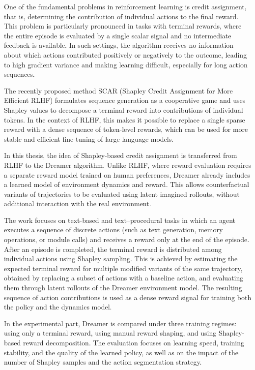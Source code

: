 One of the fundamental problems in reinforcement learning is credit assignment, that is, determining the contribution of individual actions to the final reward. This problem is particularly pronounced in tasks with terminal rewards, where the entire episode is evaluated by a single scalar signal and no intermediate feedback is available. In such settings, the algorithm receives no information about which actions contributed positively or negatively to the outcome, leading to high gradient variance and making learning difficult, especially for long action sequences.

The recently proposed method SCAR (Shapley Credit Assignment for More Efficient RLHF) formulates sequence generation as a cooperative game and uses Shapley values to decompose a terminal reward into contributions of individual tokens. In the context of RLHF, this makes it possible to replace a single sparse reward with a dense sequence of token-level rewards, which can be used for more stable and efficient fine-tuning of large language models.

In this thesis, the idea of Shapley-based credit assignment is transferred from RLHF to the Dreamer algorithm. Unlike RLHF, where reward evaluation requires a separate reward model trained on human preferences, Dreamer already includes a learned model of environment dynamics and reward. This allows counterfactual variants of trajectories to be evaluated using latent imagined rollouts, without additional interaction with the real environment.

The work focuses on text-based and text--procedural tasks in which an agent executes a sequence of discrete actions (such as text generation, memory operations, or module calls) and receives a reward only at the end of the episode. After an episode is completed, the terminal reward is distributed among individual actions using Shapley sampling. This is achieved by estimating the expected terminal reward for multiple modified variants of the same trajectory, obtained by replacing a subset of actions with a baseline action, and evaluating them through latent rollouts of the Dreamer environment model. The resulting sequence of action contributions is used as a dense reward signal for training both the policy and the dynamics model.

In the experimental part, Dreamer is compared under three training regimes: using only a terminal reward, using manual reward shaping, and using Shapley-based reward decomposition. The evaluation focuses on learning speed, training stability, and the quality of the learned policy, as well as on the impact of the number of Shapley samples and the action segmentation strategy.